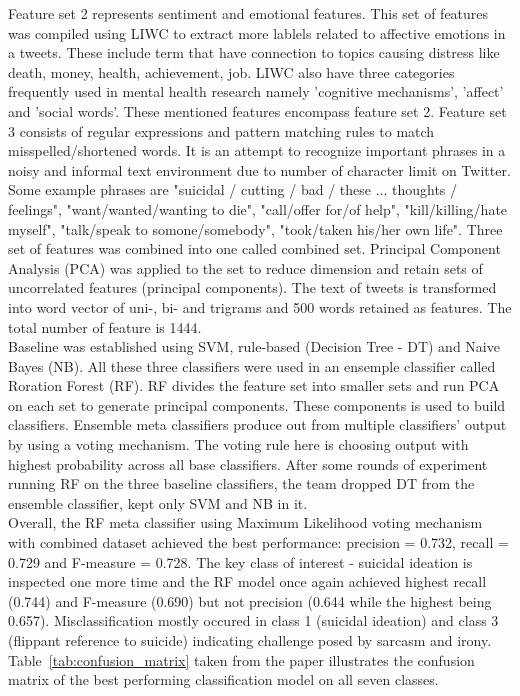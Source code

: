 Feature set 2 represents sentiment and emotional features. This set of features was compiled using LIWC to extract more lablels related to affective emotions in a tweets. These include term that have connection to topics causing distress like death, money, health, achievement, job. LIWC also have three categories frequently used in mental health research namely 'cognitive mechanisms', 'affect' and 'social words'. These mentioned features encompass feature set 2. Feature set 3 consists of regular expressions and pattern matching rules to match misspelled/shortened words. It is an attempt to recognize important phrases in a noisy and informal text environment due to number of character limit on Twitter. Some example phrases are "suicidal / cutting / bad / these ... thoughts / feelings", "want/wanted/wanting to die", "call/offer for/of help", "kill/killing/hate myself", "talk/speak to somone/somebody", "took/taken his/her own life". 
Three set of features was combined into one called combined set. Principal Component Analysis (PCA) was applied to the set to reduce dimension and retain sets of uncorrelated features (principal components). The text of tweets is transformed into word vector of uni-, bi- and trigrams and 500 words retained as features. The total number of feature is 1444.\\
Baseline was established using SVM, rule-based (Decision Tree - DT) and Naive Bayes (NB). All these three classifiers were used in an ensemple classifier called Roration Forest (RF). RF divides the feature set into smaller sets and run PCA on each set to generate principal components. These components is used to build classifiers. Ensemble meta classifiers produce out from multiple classifiers' output by using a voting mechanism. The voting rule here is choosing output with highest probability across all base classifiers. After some rounds of experiment running RF on the three baseline classifiers, the team dropped DT from the ensemble classifier, kept only SVM and NB in it.\\
Overall, the RF meta classifier using Maximum Likelihood voting mechanism with combined dataset achieved the best performance: precision = 0.732, recall = 0.729 and F-measure = 0.728. The key class of interest - suicidal ideation is inspected one more time and the RF model once again achieved highest recall (0.744) and F-measure (0.690) but not precision (0.644 while the highest being 0.657). Misclassification mostly occured in class 1 (suicidal ideation) and class 3 (flippant reference to suicide) indicating challenge posed by sarcasm and irony. Table~\ref{tab:confusion_matrix} taken from the paper \cite{Burnap2015} illustrates the confusion matrix of the best performing classification model on all seven classes.  
